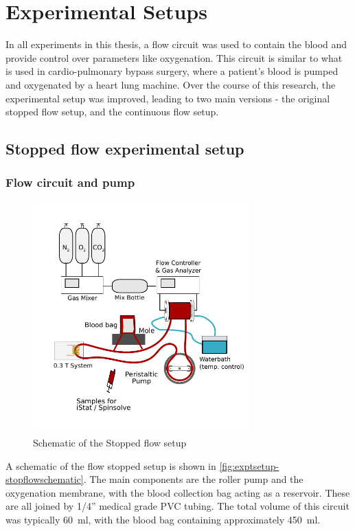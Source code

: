 \chapter{Experimental Setups}
\label{ch:exptsetup}

In all experiments in this thesis, a flow circuit was used to contain the blood and provide control over parameters like oxygenation.
This circuit is similar to what is used in cardio-pulmonary bypass surgery, where a patient's blood is pumped and oxygenated by a heart lung machine.
Over the course of this research, the experimental setup was improved, leading to two main versions - the original stopped flow setup, and the continuous flow setup.

\section{Stopped flow experimental setup}
\label{sec:exptsetup-stopflow}

\subsection{Flow circuit and pump}
\label{sec:exptsetup-flowcircuitandpump}
\begin{figure}[t]
\centering
\includegraphics[width=0.75\textwidth]{figures/exptsetup/BloodMixingSetup.pdf}
\caption{Schematic of the Stopped flow setup}
\label{fig:exptsetup-stopflowschematic}
\end{figure}

A schematic of the flow stopped setup is shown in \autoref{fig:exptsetup-stopflowschematic}.
The main components are the roller pump and the oxygenation membrane, with the blood collection bag acting as a reservoir.
These are all joined by 1/4'' medical grade PVC tubing.
The total volume of this circuit was typically \SI{60}{\milli\litre}, with the blood bag containing approximately \SI{450}{ml}.

